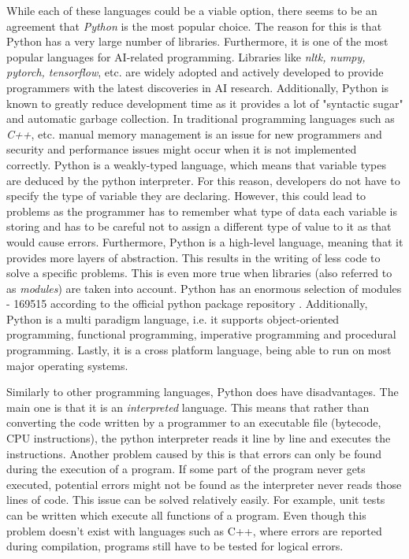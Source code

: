 \documentclass[12pt,a4paper]{article}
\begin{document}
While each of these languages could be a viable option, there seems to be an agreement that \textit{Python} is the most popular choice.  The reason for this is that Python has a very large number of libraries. Furthermore, it is one of the most popular languages for AI-related programming. Libraries like \textit{nltk, numpy, pytorch, tensorflow}, etc. are widely adopted and actively developed to provide programmers with the latest discoveries in AI research. Additionally, Python is known to greatly reduce development time as it provides a lot of "syntactic sugar" and automatic garbage collection. In traditional programming languages such as \textit{C++}, etc. manual memory management is an issue for new programmers and security and performance issues might occur when it is not implemented correctly. Python is a weakly-typed language, which means that variable types are deduced by the python interpreter. For this reason, developers do not have to specify the type of variable they are declaring. However, this could lead to problems as the programmer has to remember what type of data each variable is storing and has to be careful not to assign a different type of value to it as that would cause errors. Furthermore, Python is a high-level language, meaning that it provides more layers of abstraction. This results in the writing of less code to solve a specific problems. This is even more true when libraries (also referred to as \textit{modules}) are taken into account. Python has an enormous selection of modules - 169515 according to the official python package repository \cite{PyPI:online}. Additionally, Python is a multi paradigm language, i.e. it supports object-oriented programming, functional programming, imperative programming and procedural programming. Lastly, it is a cross platform language, being able to run on most major operating systems.

Similarly to other programming languages, Python does have disadvantages. The main one is that it is an \textit{interpreted} language. This means that rather than converting the code written by a programmer to an executable file (bytecode, CPU instructions), the python interpreter reads it line by line and executes the instructions. Another problem caused by this is that errors can only be found during the execution of a program. If some part of the program never gets executed, potential errors might not be found as the interpreter never reads those lines of code. This issue can be solved relatively easily. For example, unit tests can be written which execute all functions of a program. Even though this problem doesn't exist with languages such as C++, where errors are reported during compilation, programs still have to be tested for logical errors.
\end{document}
